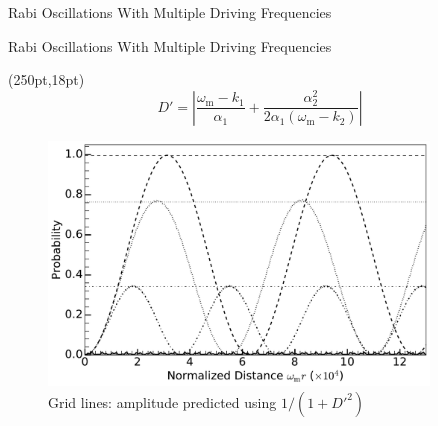 \documentclass[9pt]{beamer}
\begin{document}
\begin{darkframes}
\begin{frame}{Rabi Oscillations With Multiple Driving Frequencies}

\end{frame}


\begin{frame}{Rabi Oscillations With Multiple Driving Frequencies}

\begin{textblock*}{100pt}(250pt,18pt)
\tiny
\begin{equation*}
D' =  \left\vert \frac{\omega_{\mathrm m} - k_1 }{\alpha_1} + \frac{\alpha_2^2}{2\alpha_1(\omega_{\mathrm m}-k_2)} \right\vert
\end{equation*}
\end{textblock*}


\begin{figure}
\includegraphics[width=0.9\textwidth]{assets/interference-reduction}
\caption*{Grid lines: amplitude predicted using $1/(1+D'^2)$
}
\end{figure}



\end{frame}
\end{darkframes}
\end{document}
